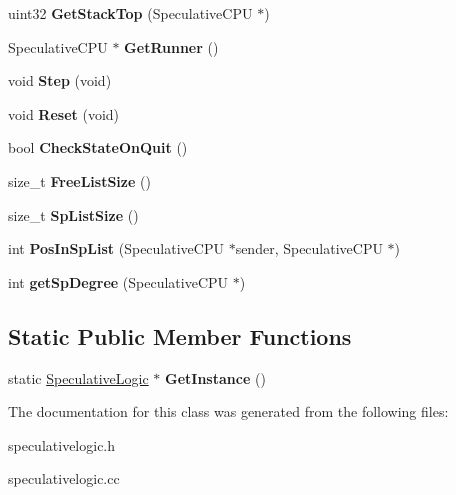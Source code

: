 \begin{DoxyCompactItemize}
\item 
\hypertarget{classSpeculativeLogic_aea27ed6fe3808b6731d3d2e6e9aa1521}{
uint32 {\bfseries GetStackTop} (SpeculativeCPU $\ast$)}
\label{classSpeculativeLogic_aea27ed6fe3808b6731d3d2e6e9aa1521}

\item 
\hypertarget{classSpeculativeLogic_a3b5cfbc29580d96258bff914f8be5f61}{
SpeculativeCPU $\ast$ {\bfseries GetRunner} ()}
\label{classSpeculativeLogic_a3b5cfbc29580d96258bff914f8be5f61}

\item 
\hypertarget{classSpeculativeLogic_a3fd5927ddc4a29f415a016ab38bd6e93}{
void {\bfseries Step} (void)}
\label{classSpeculativeLogic_a3fd5927ddc4a29f415a016ab38bd6e93}

\item 
\hypertarget{classSpeculativeLogic_a6d44073e699460877f7840e4ed7bdaf5}{
void {\bfseries Reset} (void)}
\label{classSpeculativeLogic_a6d44073e699460877f7840e4ed7bdaf5}

\item 
\hypertarget{classSpeculativeLogic_a0e1c5d513f123870ef2722d5b9969d74}{
bool {\bfseries CheckStateOnQuit} ()}
\label{classSpeculativeLogic_a0e1c5d513f123870ef2722d5b9969d74}

\item 
\hypertarget{classSpeculativeLogic_ae8addd001c76eff87101f1c8a3911a23}{
size\_\-t {\bfseries FreeListSize} ()}
\label{classSpeculativeLogic_ae8addd001c76eff87101f1c8a3911a23}

\item 
\hypertarget{classSpeculativeLogic_aefbc24db69f077274b14f607955a7358}{
size\_\-t {\bfseries SpListSize} ()}
\label{classSpeculativeLogic_aefbc24db69f077274b14f607955a7358}

\item 
\hypertarget{classSpeculativeLogic_a0f0e9ab0f1def2f9248b61324f2fc21f}{
int {\bfseries PosInSpList} (SpeculativeCPU $\ast$sender, SpeculativeCPU $\ast$)}
\label{classSpeculativeLogic_a0f0e9ab0f1def2f9248b61324f2fc21f}

\item 
\hypertarget{classSpeculativeLogic_a69fc56353e58b2a63f0711ed2b4831d6}{
int {\bfseries getSpDegree} (SpeculativeCPU $\ast$)}
\label{classSpeculativeLogic_a69fc56353e58b2a63f0711ed2b4831d6}

\end{DoxyCompactItemize}
\subsection*{Static Public Member Functions}
\begin{DoxyCompactItemize}
\item 
\hypertarget{classSpeculativeLogic_af95e558b3c77884f73b10a0fcf480fe5}{
static \hyperlink{classSpeculativeLogic}{SpeculativeLogic} $\ast$ {\bfseries GetInstance} ()}
\label{classSpeculativeLogic_af95e558b3c77884f73b10a0fcf480fe5}

\end{DoxyCompactItemize}


The documentation for this class was generated from the following files:\begin{DoxyCompactItemize}
\item 
speculativelogic.h\item 
speculativelogic.cc\end{DoxyCompactItemize}
